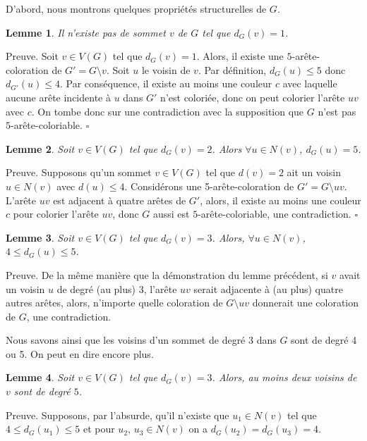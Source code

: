 \documentclass[10pt,a4paper]{article}
\newtheorem{lemme}{Lemme}
\newcommand{\ep}{{\hfill $\square$}}
\begin{document}
D'abord, nous montrons quelques propriétés structurelles de $G$.

\begin{lemme}
Il n'existe pas de sommet $v$ de $G$ tel que $d_G(v) = 1$.
\label{le:1}
\end{lemme}

Preuve. Soit $v \in V(G)$ tel que $d_G(v) = 1$. Alors, il existe une $5$-arête-coloration de $G'=G \setminus v$. Soit $u$ le voisin de $v$. Par définition, $d_G(u) \leq 5$ donc $d_{G'}(u) \leq 4$. Par conséquence, il existe au moins une couleur $c$ avec laquelle aucune arête incidente à $u$ dans $G'$ n'est coloriée, donc on peut colorier l'arête $uv$ avec $c$. On tombe donc sur une contradiction avec la supposition que $G$ n'est pas $5$-arête-coloriable.
\ep

\begin{lemme}
Soit $v \in V(G)$ tel que $d_G(v) = 2$. Alors $\forall u \in N(v)$, $d_G(u) = 5$.
\label{le:2}
\end{lemme}

Preuve.
Supposons qu'un sommet $v \in V(G)$ tel que $d(v) = 2$ ait un voisin $u \in N(v)$ avec $d(u)  \le 4$. Considérons une 5-arête-coloration de $G' = G \setminus uv$.
L'arête $uv$ est adjacent à quatre arêtes de $G'$, alors, il existe au moins une couleur $c$ pour colorier l'arête $uv$, donc $G$ aussi est $5$-arête-coloriable,  une contradiction.
\ep


\begin{lemme}
Soit $v\in V(G)$ tel que $d_G(v) = 3$. Alors, $\forall u \in N(v)$, $4\le d_G(u) \le 5$.
\label{le:33}
\end{lemme}

Preuve. De la même manière que la démonstration du lemme précédent, si $v$ avait un voisin $u$ de degré (au plus) 3, l'arête $uv$ serait adjacente à (au plus) quatre autres arêtes, alors, n'importe quelle coloration de $G\setminus uv$ donnerait une coloration de $G$, une contradiction.

Nous savons ainsi que les voisins d'un sommet de degré 3 dans $G$ sont de degré 4 ou 5. On peut en dire encore plus.

\begin{lemme}
Soit $v\in V(G)$ tel que $d_G(v) = 3$. Alors, au moins deux voisins de $v$ sont de degré $5$.
\label{le:434}
\end{lemme}

Preuve.
Supposons, par l'absurde, qu'il n'existe que $u_1 \in N(v)$ tel que $4\le d_G(u_1) \le 5$ et pour $ u_2$, $u_3 \in N(v)$ on a $d_G(u_2) = d_G(u_3) = 4$. 
\end{document}
